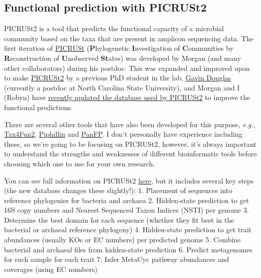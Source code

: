 \documentclass[
]{book}
\begin{document}
\subsection{Functional prediction with PICRUSt2}\label{functional-prediction-with-picrust2}

PICRUSt2 is a tool that predicts the functional capacity of a microbial community based on the taxa that are present in amplicon sequencing data. The first iteration of \href{https://www.nature.com/articles/nbt.2676}{PICRUSt} (\textbf{P}hylogenetic \textbf{I}nvestigation of \textbf{C}ommunities by \textbf{R}econstruction of \textbf{U}nobserved \textbf{St}ates) was developed by Morgan (and many other collaborators) during his postdoc. This was expanded and improved upon to make \href{https://www.nature.com/articles/s41587-020-0548-6}{PICRUSt2} by a previous PhD student in the lab, \href{https://www.gavindouglas.ca/}{Gavin Douglas} (currently a postdoc at North Carolina State University), and Morgan and I (Robyn) have \href{https://academic.oup.com/bioinformatics/article/41/5/btaf269/8121151}{recently updated the database used by PICRUSt2} to improve the functional predictions.

There are several other tools that have also been developed for this purpose, \emph{e.g.}, \href{https://environmentalmicrobiome.biomedcentral.com/articles/10.1186/s40793-020-00358-7}{Tax4Fun2}, \href{https://bmcgenomics.biomedcentral.com/articles/10.1186/s12864-019-6427-1}{Piphillin} and \href{https://bmcresnotes.biomedcentral.com/articles/10.1186/s13104-015-1462-8}{PanFP}. I don't personally have experience including these, so we're going to be focusing on PICRUSt2, however, it's always important to understand the strengths and weaknesses of different bioinformatic tools before choosing which one to use for your own research.

You can see full information on PICRUSt2 \href{https://github.com/picrust/picrust2/wiki}{here}, but it includes several key steps (the new database changes these slightly!):
1. Placement of sequences into reference phylogenies for bacteria and archaea
2. Hidden-state prediction to get 16S copy numbers and Nearest Sequenced Taxon Indices (NSTI) per genome
3. Determine the best domain for each sequence (whether they fit best in the bacterial or archaeal reference phylogeny)
4. Hidden-state prediction to get trait abundances (usually KOs or EC numbers) per predicted genome
5. Combine bacterial and archaeal files from hidden-state prediction
6. Predict metagenomes for each sample for each trait
7. Infer MetaCyc pathway abundances and coverages (using EC numbers)
\end{document}
